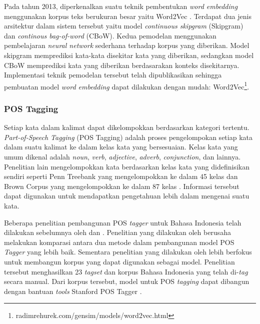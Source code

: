 Pada tahun 2013, diperkenalkan suatu teknik pembentukan \textit{word embedding} menggunakan korpus teks berukuran besar yaitu Word2Vec \cite{mikolov2013distributed}. Terdapat dua jenis arsitektur dalam sistem tersebut yaitu model \textit{continuous skipgram} (Skipgram) dan \textit{continous bag-of-word} (CBoW). Kedua pemodelan menggunakan pembelajaran \textit{neural network} sederhana terhadap korpus yang diberikan. Model skipgram memprediksi kata-kata disekitar kata yang diberikan, sedangkan model CBoW memprediksi kata yang diberikan berdasarakan konteks disekitarnya. Implementasi teknik pemodelan tersebut telah dipublikasikan sehingga pembuatan model \textit{word embedding} dapat dilakukan dengan mudah: Word2Vec\footnote{radimrehurek.com/gensim/models/word2vec.html}.
%

\subsubsection{POS Tagging}
Setiap kata dalam kalimat dapat dikelompokkan berdasarkan kategori tertentu. \textit{Part-of-Speech Tagging} (POS Tagging) adalah proses pengelompokan setiap kata dalam suatu kalimat ke dalam kelas kata yang bersesuaian. Kelas kata yang umum dikenal adalah \textit{noun}, \textit{verb}, \textit{adjective}, \textit{adverb}, \textit{conjunction}, dan lainnya. Penelitian lain mengelompokkan kata berdasarkan kelas kata yang didefinisikan sendiri seperti Penn Treebank yang mengelompokkan ke dalam 45 kelas \citep{marcus1993building} dan Brown Corpus yang mengelompokkan ke dalam 87 kelas \citep{francis1979brown}. Informasi tersebut dapat digunakan untuk mendapatkan pengetahuan lebih dalam mengenai suatu kata. 

Beberapa penelitian pembangunan POS \textit{tagger} untuk Bahasa Indonesia telah dilakukan sebelumnya oleh \cite{adriani2009statistical} dan \cite{dinakaramani2014designing}. Penelitian yang dilakukan oleh \cite{adriani2009statistical} berusaha melakukan komparasi antara dua metode dalam pembangunan model POS \textit{Tagger} yang lebih baik. Sementara penelitian yang dilakukan oleh \cite{dinakaramani2014designing} lebih berfokus untuk membangun korpus yang dapat digunakan sebagai model. Penelitian tersebut menghasilkan 23 \textit{tagset} dan korpus Bahasa Indonesia yang telah di-\textit{tag} secara manual. Dari korpus tersebut, model untuk POS \textit{tagging} dapat dibangun dengan bantuan \textit{tools} Stanford POS Tagger \citep{toutanova2003feature}.

